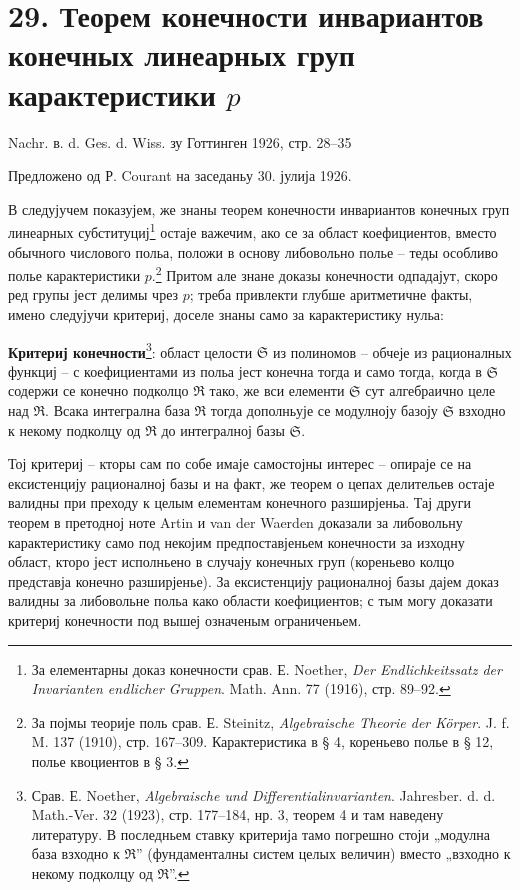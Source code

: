 ﻿\documentclass[11pt]{article}
\begin{document}
\section*{29. Теорем конечности инвариантов конечных линеарных груп карактеристики $p$}

\begin{center}
Nachr. в. d. Ges. d. Wiss. зу Готтинген 1926, стр. 28--35
\end{center}

Предложено од Р. Courant на заседаньу 30. јулија 1926.

В следујучем показујем, же знаны теорем конечности инвариантов конечных груп линеарных субституциј\footnote{За елементарны доказ конечности срав. Е. Noether, \emph{Der Endlichkeitssatz der Invarianten endlicher Gruppen}. Math. Ann. 77 (1916), стр. 89--92.} остаје важечим, ако се за област коефициентов, вместо обычного числового польа, положи в основу либовольно полье -- теды особливо полье карактеристики $p$.\footnote{За појмы теорије поль срав. Е. Steinitz, \emph{Algebraische Theorie der Körper}. J. f. M. 137 (1910), стр. 167--309. Карактеристика в § 4, кореньево полье в § 12, полье квоциентов в § 3.} Притом але знане доказы конечности одпадајут, скоро ред групы јест делимы чрез $p$; треба привлекти глубше аритметичне факты, имено следујучи критериј, доселе знаны само за карактеристику нульа:

\textbf{Критериј конечности}\footnote{Срав. Е. Noether, \emph{Algebraische und Differentialinvarianten}. Jahresber. d. d. Math.-Ver. 32 (1923), стр. 177--184, нр. 3, теорем 4 и там наведену литературу. В последньем ставку критерија тамо погрешно стоји „модулна база взходно к $\mathfrak R$” (фундаменталны систем целых величин) вместо „взходно к некому подколцу од $\mathfrak R$”.}: област целости $\mathfrak S$ из полиномов -- обчеје из рационалных функциј -- с коефициентами из польа јест конечна тогда и само тогда, когда в $\mathfrak S$ содержи се конечно подколцо $\mathfrak R$ тако, же вси елементи $\mathfrak S$ сут алгебраично целе над $\mathfrak R$. Всака интегрална база $\mathfrak R$ тогда дополньује се модулноју базоју $\mathfrak S$ взходно к некому подколцу од $\mathfrak R$ до интегралној базы $\mathfrak S$.

Тој критериј -- кторы сам по собе имаје самостојны интерес -- опираје се на ексистенцију рационалној базы и на факт, же теорем о цепах делительев остаје валидны при преходу к целым елементам конечного разширјеньа. Тај други теорем в претодној ноте Artin и van der Waerden доказали за либовольну карактеристику само под некојим предпоставјеньем конечности за изходну област, кторо јест исполньено в случају конечных груп (кореньево колцо представја конечно разширјенье). За ексистенцију рационалној базы дајем доказ валидны за либовольне польа како области коефициентов; с тым могу доказати критериј конечности под вышеј означеным ограниченьем.
\end{document}
